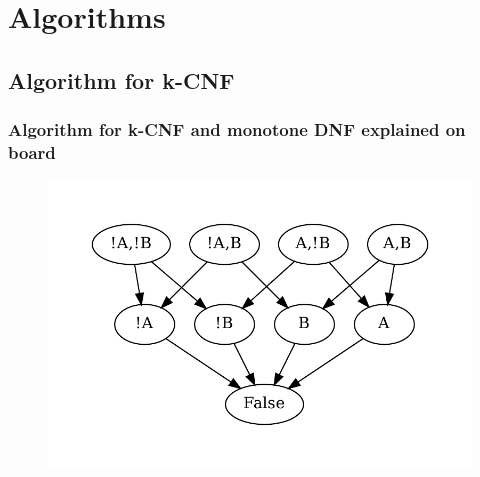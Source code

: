 \documentclass{beamer}
\begin{document}
	\section{Algorithms}
\subsection{Algorithm for k-CNF}
\begin{frame}
	\frametitle{Algorithm for k-CNF and monotone DNF explained on board}
	\begin{figure}
		\includegraphics[height=0.9\textheight]{lattice}
	\end{figure}
\end{frame}
\end{document}
